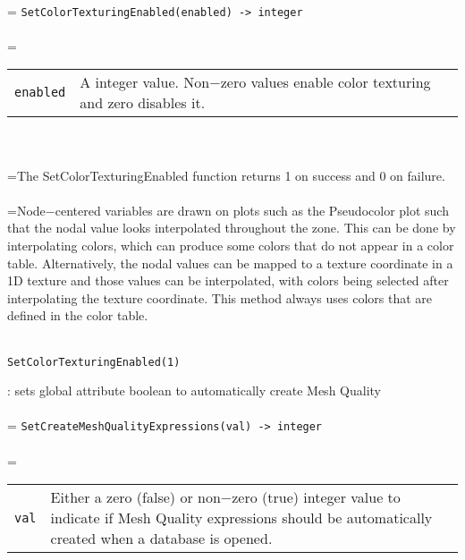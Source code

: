 \documentclass[10pt,a4paper]{report}
\begin{document}
 \\ 
\hangindent=\parindent 
\verb!SetColorTexturingEnabled(enabled) -> integer!\\ [-3mm]

 \\ 
\hangindent=\parindent 
\begin{tabular}{lp{9cm}}
\verb!enabled! & A integer value. Non$-$zero values enable color texturing and zero disables it. \\
\end{tabular} \\[-2mm]


 \\ 
\hangindent=\parindent The SetColorTexturingEnabled function returns 1 on success and 0 on failure. \\[-3mm] 

 \\ 
\hangindent=\parindent Node$-$centered variables are drawn on plots such as the Pseudocolor plot such that the nodal value looks interpolated throughout the zone. This can be done by interpolating colors, which can produce some colors that do not appear in a color table. Alternatively, the nodal values can be mapped to a texture coordinate in a 1D texture and those values can be interpolated, with colors being selected after interpolating the texture coordinate. This method always uses colors that are defined in the color table. \\[-3mm] 

\\[-6mm]
\begin{verbatim}SetColorTexturingEnabled(1)
\end{verbatim}
\newpage


{}
: sets global attribute boolean to automatically create Mesh Quality \\[-3mm]

 \\ 
\hangindent=\parindent 
\verb!SetCreateMeshQualityExpressions(val) -> integer!\\ [-3mm]

 \\ 
\hangindent=\parindent 
\begin{tabular}{lp{9cm}}
\verb!val! & Either a zero (false) or non$-$zero (true) integer value to indicate if Mesh Quality expressions should be automatically created when a  database is opened. \\
\end{tabular} \\[-2mm]
\end{document}
